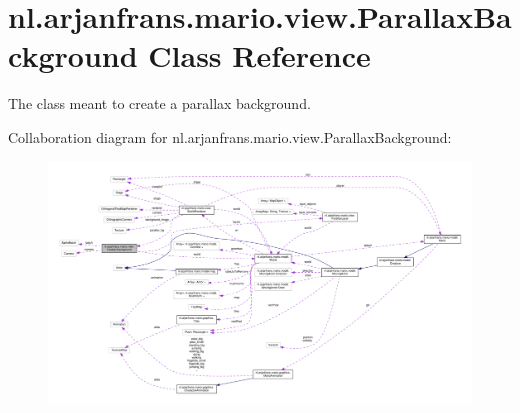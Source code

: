 \hypertarget{classnl_1_1arjanfrans_1_1mario_1_1view_1_1ParallaxBackground}{}\section{nl.\+arjanfrans.\+mario.\+view.\+Parallax\+Background Class Reference}
\label{classnl_1_1arjanfrans_1_1mario_1_1view_1_1ParallaxBackground}


The class meant to create a parallax background.  




Collaboration diagram for nl.\+arjanfrans.\+mario.\+view.\+Parallax\+Background\+:
\nopagebreak
\begin{figure}[H]
\begin{center}
\leavevmode
\includegraphics[width=350pt]{classnl_1_1arjanfrans_1_1mario_1_1view_1_1ParallaxBackground__coll__graph}
\end{center}
\end{figure}

